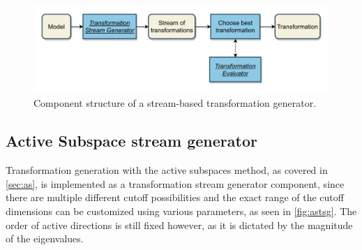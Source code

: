 \documentclass[
  a4paper,  %
  twoside,  %
  bibliography=totoc,
  headsepline,
  cleardoublepage=empty,
  parskip=half,
  draft=false
]{scrbook}
\begin{document}
\begin{mdframed}[style=style,frametitle={Transformation generator (stream-based)}]
\begin{figure}[H]
\includegraphics[width=\textwidth]{graphics/TransformationGen_Stream.pdf}
\delimit
\caption{Component structure of a stream-based transformation generator.}
\label{fig:tsg}
\end{figure}
\end{mdframed}

\newpage
\subsection{Active Subspace stream generator}

Transformation generation with the active subspaces method, as covered in \cref{sec:as}, is implemented as a transformation stream generator component, since there are multiple different cutoff possibilities and the exact range of the cutoff dimensions can be customized using various parameters, as seen in \cref{fig:astsg}.
The order of active directions is still fixed however, as it is dictated by the magnitude of the eigenvalues.
\end{document}
